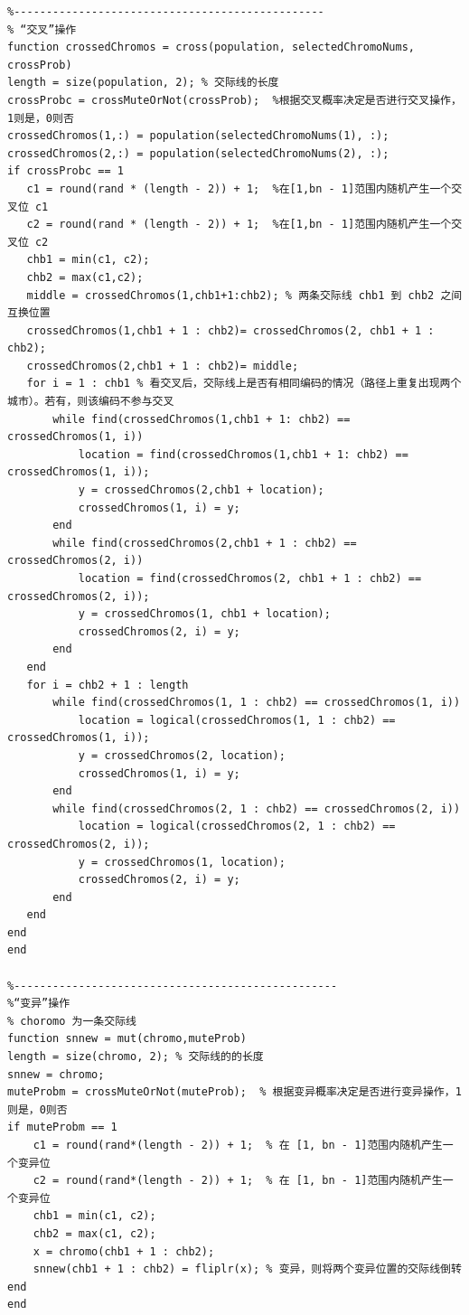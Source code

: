 \documentclass{article}
\begin{document}
\begin{appendices}
\begin{lstlisting}
%------------------------------------------------
% “交叉”操作
function crossedChromos = cross(population, selectedChromoNums, crossProb)
length = size(population, 2); % 交际线的长度
crossProbc = crossMuteOrNot(crossProb);  %根据交叉概率决定是否进行交叉操作，1则是，0则否
crossedChromos(1,:) = population(selectedChromoNums(1), :);
crossedChromos(2,:) = population(selectedChromoNums(2), :);
if crossProbc == 1
   c1 = round(rand * (length - 2)) + 1;  %在[1,bn - 1]范围内随机产生一个交叉位 c1
   c2 = round(rand * (length - 2)) + 1;  %在[1,bn - 1]范围内随机产生一个交叉位 c2
   chb1 = min(c1, c2);
   chb2 = max(c1,c2);
   middle = crossedChromos(1,chb1+1:chb2); % 两条交际线 chb1 到 chb2 之间互换位置
   crossedChromos(1,chb1 + 1 : chb2)= crossedChromos(2, chb1 + 1 : chb2);
   crossedChromos(2,chb1 + 1 : chb2)= middle;
   for i = 1 : chb1 % 看交叉后，交际线上是否有相同编码的情况（路径上重复出现两个城市）。若有，则该编码不参与交叉
       while find(crossedChromos(1,chb1 + 1: chb2) == crossedChromos(1, i))
           location = find(crossedChromos(1,chb1 + 1: chb2) == crossedChromos(1, i));
           y = crossedChromos(2,chb1 + location);
           crossedChromos(1, i) = y;
       end
       while find(crossedChromos(2,chb1 + 1 : chb2) == crossedChromos(2, i))
           location = find(crossedChromos(2, chb1 + 1 : chb2) == crossedChromos(2, i));
           y = crossedChromos(1, chb1 + location);
           crossedChromos(2, i) = y;
       end
   end
   for i = chb2 + 1 : length
       while find(crossedChromos(1, 1 : chb2) == crossedChromos(1, i))
           location = logical(crossedChromos(1, 1 : chb2) == crossedChromos(1, i));
           y = crossedChromos(2, location);
           crossedChromos(1, i) = y;
       end
       while find(crossedChromos(2, 1 : chb2) == crossedChromos(2, i))
           location = logical(crossedChromos(2, 1 : chb2) == crossedChromos(2, i));
           y = crossedChromos(1, location);
           crossedChromos(2, i) = y;
       end
   end
end
end
 
%--------------------------------------------------
%“变异”操作
% choromo 为一条交际线
function snnew = mut(chromo,muteProb)
length = size(chromo, 2); % 交际线的的长度
snnew = chromo;
muteProbm = crossMuteOrNot(muteProb);  % 根据变异概率决定是否进行变异操作，1则是，0则否
if muteProbm == 1
    c1 = round(rand*(length - 2)) + 1;  % 在 [1, bn - 1]范围内随机产生一个变异位
    c2 = round(rand*(length - 2)) + 1;  % 在 [1, bn - 1]范围内随机产生一个变异位
    chb1 = min(c1, c2);
    chb2 = max(c1, c2);
    x = chromo(chb1 + 1 : chb2);
    snnew(chb1 + 1 : chb2) = fliplr(x); % 变异，则将两个变异位置的交际线倒转
end
end
 

\end{lstlisting}
\end{appendices}
\end{document}
